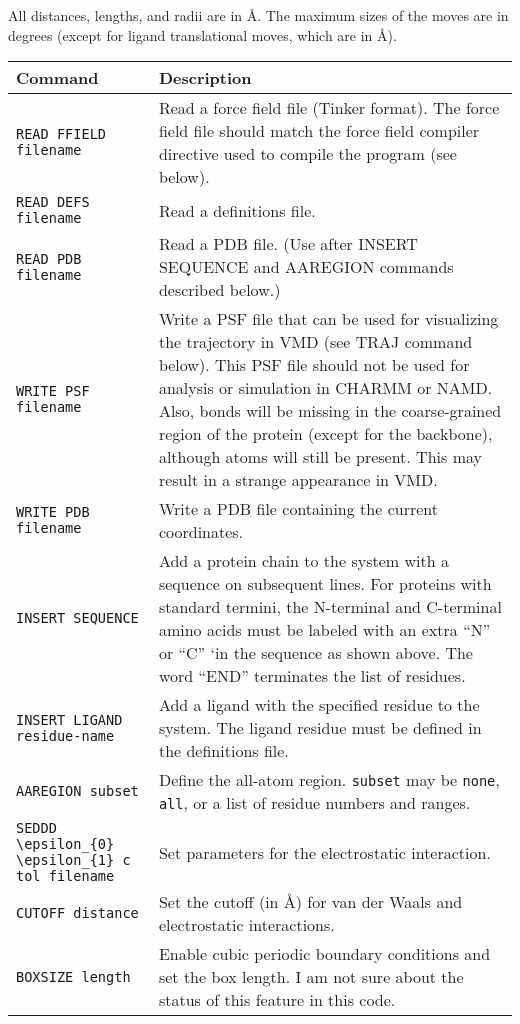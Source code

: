 \documentclass{article}      %
\begin{document}
All distances, lengths, and radii are in \AA.  The maximum sizes of the moves are in degrees (except for ligand translational moves, which are in \AA).

\begin{longtable}{|l|p{3.25in}|}
\hline
Command & Description \\
\hline
\verb+READ FFIELD filename+ & Read a force field file (Tinker format).  The force field file should match the force field compiler directive used to compile the program (see below).   \\
\hline
\verb+READ DEFS filename+ & Read a definitions file. \\
\hline
\verb+READ PDB filename+ & Read a PDB file. (Use after INSERT SEQUENCE and AAREGION commands described below.) \\
\hline
\verb+WRITE PSF filename+ & Write a PSF file that can be used for visualizing the trajectory in VMD (see TRAJ command below).  This PSF file should not be used for analysis or simulation in CHARMM or NAMD.  Also, bonds will be missing in the coarse-grained region of the  protein (except for the backbone), although atoms will still be present.  This may result in a strange appearance in VMD. \\ 
\hline
\verb+WRITE PDB filename+ & Write a PDB file containing the current coordinates. \\
\hline
\verb+INSERT SEQUENCE+ & Add a protein chain to the system with a sequence on subsequent lines.  For proteins with standard termini, the N-terminal and C-terminal amino acids must be labeled with an extra ``N'' or ``C'' `in the sequence as shown above.  The word ``END'' terminates the list of residues. \\
\hline
\verb+INSERT LIGAND residue-name+ & Add a ligand with the specified residue to the system.  The ligand residue must be defined in the definitions file.\\
\hline
\verb+AAREGION subset+ & Define the all-atom region.  \verb+subset+ may be \verb+none+, \verb+all+, or a list of residue numbers and ranges. \\
\hline
\verb+SEDDD \epsilon_{0} \epsilon_{1} c tol filename +& Set parameters for the electrostatic interaction. \\
\hline
\verb+CUTOFF distance+& Set the cutoff (in \AA) for van der Waals and electrostatic interactions. \\
\hline
\verb+BOXSIZE length+& Enable cubic periodic boundary conditions and set the box length.  I am not sure about the status of this feature in this code. \\

\end{longtable}
\end{document}
